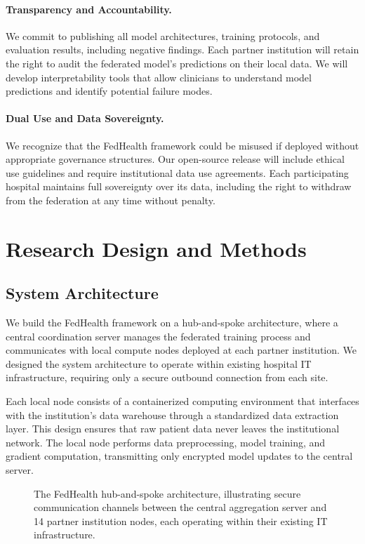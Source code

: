 \documentclass[12pt,letterpaper]{article}
\begin{document}
\paragraph{Transparency and Accountability.} We commit to publishing all model architectures, training protocols, and evaluation results, including negative findings. Each partner institution will retain the right to audit the federated model's predictions on their local data. We will develop interpretability tools that allow clinicians to understand model predictions and identify potential failure modes.

\paragraph{Dual Use and Data Sovereignty.} We recognize that the FedHealth framework could be misused if deployed without appropriate governance structures. Our open-source release will include ethical use guidelines and require institutional data use agreements. Each participating hospital maintains full sovereignty over its data, including the right to withdraw from the federation at any time without penalty.

\section{Research Design and Methods}
\label{sec:methods}

\subsection{System Architecture}

We build the FedHealth framework on a hub-and-spoke architecture, where a central coordination server manages the federated training process and communicates with local compute nodes deployed at each partner institution. We designed the system architecture to operate within existing hospital IT infrastructure, requiring only a secure outbound connection from each site.

Each local node consists of a containerized computing environment that interfaces with the institution's data warehouse through a standardized data extraction layer. This design ensures that raw patient data never leaves the institutional network. The local node performs data preprocessing, model training, and gradient computation, transmitting only encrypted model updates to the central server.

\begin{figure}[H]
\centering
{}
\caption{The FedHealth hub-and-spoke architecture, illustrating secure communication channels between the central aggregation server and 14 partner institution nodes, each operating within their existing IT infrastructure.}
\label{fig:architecture}
\end{figure}
\end{document}

